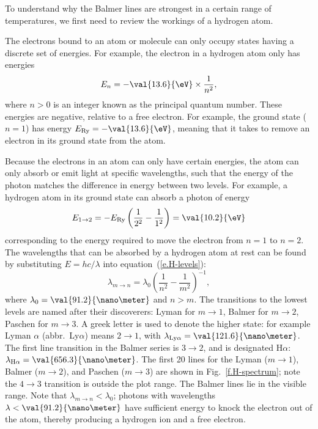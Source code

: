 To understand why the Balmer lines are strongest in a certain range of temperatures, we first need to review the workings of a hydrogen atom.

The electrons bound to an atom or molecule can only occupy states having a discrete set of energies. For example, the electron in a hydrogen atom only has energies
\begin{equation}\label{e.H-levels}
        E_{n} = -\val{13.6}{\eV}\times \frac{1}{n^{2}},
\end{equation}
where $n > 0$ is an integer known as the principal quantum number.  These energies are negative, relative to a free electron.  For example, the ground state ($n=1$) has energy $\ERy = -\val{13.6}{\eV}$, meaning that it takes  to remove an electron in its ground state from the atom.

Because the electrons in an atom can only have certain energies, the atom can only absorb or emit light at specific wavelengths, such that the energy of the photon matches the difference in energy between two levels. For example, a hydrogen atom in its ground state can absorb a photon of energy
\[
        E_{1\to2} = -\ERy \left(\frac{1}{2^{2}} - \frac{1}{1^{2}}\right)
                 = \val{10.2}{\eV}
\]
corresponding to the energy required to move the electron from $n=1$ to $n=2$. The wavelengths that can be absorbed by a hydrogen atom at rest can be found by substituting $E = hc/\lambda$ into equation~(\ref{e.H-levels}):
\begin{equation}
        \lambda_{m\to n} = \lambda_{0}\left(\frac{1}{n^{2}}-\frac{1}{m^{2}}\right)^{-1},
\end{equation}
where $\lambda_{0} = \val{91.2}{\nano\meter}$ and $n > m$.
The transitions to the lowest levels are named after their discoverers: Lyman for $m\to1$, Balmer for $m\to2$, Paschen for $m\to3$. A greek letter is used to denote the higher state: for example Lyman $\alpha$ (abbr.\ Ly$\alpha$) means $2\to1$, with $\lambda_{\mathrm{Ly}\alpha} = \val{121.6}{\nano\meter}$.  The first line transition in the Balmer series is $3\to2$, and is designated H$\alpha$: $\lambda_{\mathrm{H}\alpha} = \val{656.3}{\nano\meter}$. The first 20 lines for the Lyman ($m\to1$), Balmer ($m\to2$), and Paschen ($m\to3$) are shown in Fig.~\ref{f.H-spectrum}; note the $4\to3$ transition is outside the plot range. The Balmer lines lie in the visible range. Note that $\lambda_{m\to n} < \lambda_{0}$; photons with wavelengths $\lambda < \val{91.2}{\nano\meter}$ have sufficient energy to knock the electron out of the atom, thereby producing a hydrogen ion and a free electron.

